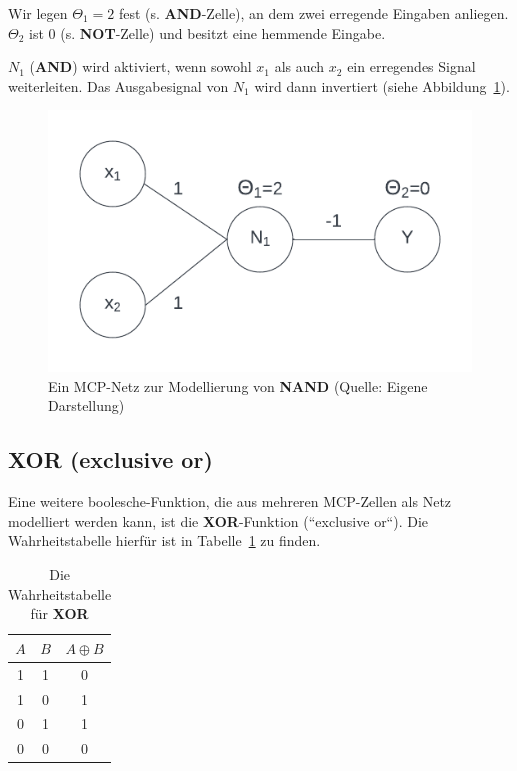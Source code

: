 {Wir legen $\Theta_1 = 2$ fest (s. \textbf{AND}-Zelle), an dem zwei erregende Eingaben anliegen. $\Theta_2$ ist $0$ (s. \textbf{NOT}-Zelle) und besitzt eine hemmende Eingabe.

$N_1$ (\textbf{AND}) wird aktiviert, wenn sowohl $x_1$ als auch $x_2$ ein erregendes Signal weiterleiten. Das Ausgabesignal von $N_1$  wird dann invertiert (siehe Abbildung~\ref{fig:mcpnand}).


\begin{figure}[h]
    \centering
    \includegraphics{chapters/3. Kuenstliche Neuronen/mcpnand}
    \caption{Ein MCP-Netz zur Modellierung von \textbf{NAND} (Quelle: Eigene Darstellung)}
    \label{fig:mcpnand}
\end{figure}


\subsection*{XOR (exclusive or)}

Eine weitere boolesche-Funktion, die aus mehreren MCP-Zellen als Netz modelliert werden kann, ist die \textbf{XOR}-Funktion (``exclusive or``). Die Wahrheitstabelle hierfür ist in Tabelle~\ref{tab:xor} zu finden.

\begin{table} %
    \centering
    \begin{tabular}{c | c | c}
        $A$ & $B$ & $A \oplus B$ \\
        \hline
        1   & 1   & 0           \\
        1   & 0   & 1           \\
        0   & 1   & 1           \\
        0   & 0   & 0           \\
    \end{tabular}
    \caption{Die Wahrheitstabelle für \textbf{XOR}}
    \label{tab:xor}
\end{table}


}
